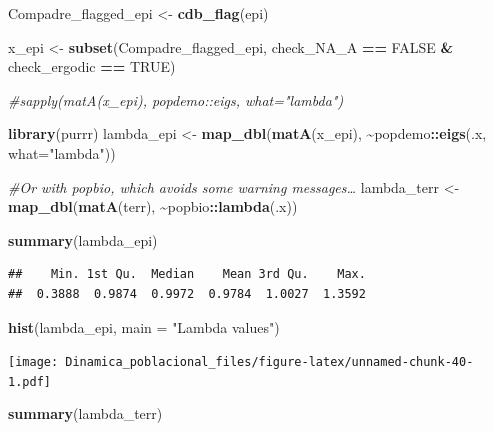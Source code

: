 \documentclass[
]{book}
\newenvironment{Shaded}{\begin{snugshade}}{\end{snugshade}}
\newcommand{\AttributeTok}[1]{\textcolor[rgb]{0.13,0.29,0.53}{#1}}
\newcommand{\CommentTok}[1]{\textcolor[rgb]{0.56,0.35,0.01}{\textit{#1}}}
\newcommand{\ConstantTok}[1]{\textcolor[rgb]{0.56,0.35,0.01}{#1}}
\newcommand{\FunctionTok}[1]{\textcolor[rgb]{0.13,0.29,0.53}{\textbf{#1}}}
\newcommand{\NormalTok}[1]{#1}
\newcommand{\OtherTok}[1]{\textcolor[rgb]{0.56,0.35,0.01}{#1}}
\newcommand{\SpecialCharTok}[1]{\textcolor[rgb]{0.81,0.36,0.00}{\textbf{#1}}}
\newcommand{\StringTok}[1]{\textcolor[rgb]{0.31,0.60,0.02}{#1}}
\theoremstyle{definition}
\theoremstyle{definition}
\theoremstyle{definition}
\theoremstyle{definition}
\theoremstyle{remark}
\begin{document}
\begin{Shaded}
\begin{Highlighting}[]
\NormalTok{Compadre\_flagged\_epi }\OtherTok{\textless{}{-}} \FunctionTok{cdb\_flag}\NormalTok{(epi)}

\NormalTok{x\_epi }\OtherTok{\textless{}{-}} \FunctionTok{subset}\NormalTok{(Compadre\_flagged\_epi, check\_NA\_A }\SpecialCharTok{==} \ConstantTok{FALSE} \SpecialCharTok{\&}\NormalTok{ check\_ergodic }\SpecialCharTok{==} \ConstantTok{TRUE}\NormalTok{)}

\CommentTok{\#sapply(matA(x\_epi), popdemo::eigs, what="lambda")}

\FunctionTok{library}\NormalTok{(purrr)}
\NormalTok{lambda\_epi }\OtherTok{\textless{}{-}} \FunctionTok{map\_dbl}\NormalTok{(}\FunctionTok{matA}\NormalTok{(x\_epi), }\SpecialCharTok{\textasciitilde{}}\NormalTok{popdemo}\SpecialCharTok{::}\FunctionTok{eigs}\NormalTok{(.x, }\AttributeTok{what=}\StringTok{"lambda"}\NormalTok{))}

\CommentTok{\#Or with popbio, which avoids some warning messages…}
\NormalTok{lambda\_terr }\OtherTok{\textless{}{-}} \FunctionTok{map\_dbl}\NormalTok{(}\FunctionTok{matA}\NormalTok{(terr), }\SpecialCharTok{\textasciitilde{}}\NormalTok{popbio}\SpecialCharTok{::}\FunctionTok{lambda}\NormalTok{(.x))}
\end{Highlighting}
\end{Shaded}

\begin{Shaded}
\begin{Highlighting}[]
\FunctionTok{summary}\NormalTok{(lambda\_epi)}
\end{Highlighting}
\end{Shaded}

\begin{verbatim}
##    Min. 1st Qu.  Median    Mean 3rd Qu.    Max. 
##  0.3888  0.9874  0.9972  0.9784  1.0027  1.3592
\end{verbatim}

\begin{Shaded}
\begin{Highlighting}[]
\FunctionTok{hist}\NormalTok{(lambda\_epi, }\AttributeTok{main =} \StringTok{"Lambda values"}\NormalTok{)}
\end{Highlighting}
\end{Shaded}

\texttt{[image: Dinamica\_poblacional\_files/figure-latex/unnamed-chunk-40-1.pdf]}

\begin{Shaded}
\begin{Highlighting}[]
\FunctionTok{summary}\NormalTok{(lambda\_terr)}
\end{Highlighting}
\end{Shaded}
\end{document}
